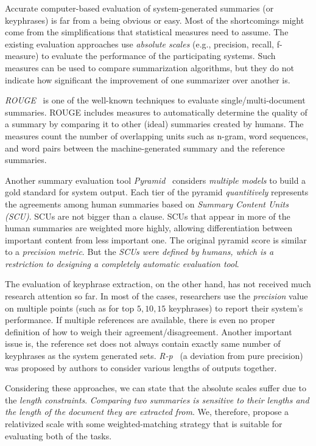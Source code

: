 \documentclass[a4paper]{report}
\begin{document}
\par  Accurate computer-based evaluation of system-generated summaries (or keyphrases) is far from a being obvious or easy. Most of the shortcomings might come from the simplifications that statistical measures need to assume. %
The existing evaluation approaches use \emph{absolute scales} (e.g., precision, recall, f-measure) to evaluate the performance of the participating systems. Such measures can be used to compare summarization algorithms, but they do not indicate how significant the improvement of one summarizer over another is.
\par \emph{ROUGE}~\cite{Lin04rouge:a} is one of the well-known techniques to evaluate single/multi-document summaries. ROUGE includes measures to automatically determine the quality of a summary by comparing it to other (ideal) summaries created by humans. The measures count the number of overlapping units such as n-gram, word sequences, and word pairs between the machine-generated summary and the reference summaries.
\par Another summary evaluation tool \emph{Pyramid}~\cite{Nenkova:2007:PMI:1233912.1233913} considers \emph{multiple models} to build a gold standard for system output. Each tier of the pyramid \emph{quantitively} represents the agreements among human summaries based on \emph{Summary Content Units (SCU)}. SCUs are not bigger than a clause. SCUs that appear in more of the human summaries are weighted more highly, allowing differentiation between important content from less important one. The original pyramid score is similar to a \emph{precision metric}. But the \emph{SCUs were defined by humans, which is a restriction to designing a completely automatic evaluation tool}.
\par The evaluation of keyphrase extraction, on the other hand, has not received much research attention so far. In most of the cases, researchers use the \emph{precision} value on multiple points (such as for top $5, 10, 15$ keyphrases) to report their system's performance. If multiple references are available, there is even no proper definition of how to weigh their agreement/disagreement. Another important issue is, the reference set does not always contain exactly same number of keyphrases as the system generated sets. \emph{R-p}~\cite{DBLP:conf/ranlp/ZeschG09} (a deviation from pure precision) was proposed by authors to consider various lengths of outputs together. 
\par Considering these approaches, we can state that the absolute scales suffer due to the \emph{length constraints}. \emph{Comparing two summaries is sensitive to their lengths and the length of the document they are extracted from}. We, therefore, propose a relativized scale with some weighted-matching strategy that is suitable for evaluating both of the tasks. 
\end{document}
